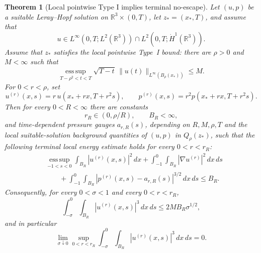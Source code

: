 \documentclass[11pt]{amsart}
\numberwithin{equation}{section}
\theoremstyle{plain}
\newtheorem{theorem}{Theorem}[section]
\theoremstyle{definition}
\theoremstyle{remark}
\newcommand{\esssup}{\operatorname*{ess\,sup}}
\begin{document}
\begin{theorem}[Local pointwise Type I implies terminal no-escape]
\label{thm:local-typeI-terminal-energy-package}
Let \((u,p)\) be a suitable Leray--Hopf solution on
\(\mathbb R^3\times(0,T)\), let \(z_*=(x_*,T)\), and assume that
\[
  u\in L^\infty(0,T;L^2(\mathbb R^3))
  \cap L^2(0,T;\dot H^1(\mathbb R^3)).
\]
Assume that \(z_*\) satisfies the local pointwise Type~I bound: there are
\(\rho>0\) and \(M<\infty\) such that
\begin{equation}\label{eq:local-typeI-terminal-noescape-assumption}
  \esssup_{T-\rho^2<t<T}
  \sqrt{T-t}\,\|u(t)\|_{L^\infty(B_\rho(x_*))}
  \le M .
\end{equation}
For \(0<r<\rho\), set
\[
  u^{(r)}(x,s)
  =
  r\,u(x_*+rx,T+r^2s),
  \qquad
  p^{(r)}(x,s)
  =
  r^2p(x_*+rx,T+r^2s).
\]
Then for every \(0<R<\infty\) there are constants
\[
  r_R\in(0,\rho/R),\qquad B_R<\infty,
\]
and time-dependent pressure gauges \(a_{r,R}(s)\), depending on
\(R,M,\rho,T\) and the local suitable-solution background quantities of
\((u,p)\) in \(Q_\rho(z_*)\), such that the following terminal local energy
estimate holds for every \(0<r<r_R\):
\begin{equation}\label{eq:local-terminal-energy-package}
\begin{aligned}
  &\esssup_{-1<s<0}\int_{B_R}|u^{(r)}(x,s)|^2\,dx
  +\int_{-1}^{0}\int_{B_R}|\nabla u^{(r)}|^2\,dx\,ds  \\
  &\qquad
  +\int_{-1}^{0}\int_{B_R}
      |p^{(r)}(x,s)-a_{r,R}(s)|^{3/2}\,dx\,ds
  \le B_R .
\end{aligned}
\end{equation}
Consequently, for every \(0<\sigma<1\) and every \(0<r<r_R\),
\begin{equation}\label{eq:local-terminal-noescape-bound}
  \int_{-\sigma}^{0}\int_{B_R}|u^{(r)}(x,s)|^3\,dx\,ds
  \le
  2MB_R\sigma^{1/2},
\end{equation}
and in particular
\begin{equation}\label{eq:local-terminal-noescape}
  \lim_{\sigma\downarrow0}
  \sup_{0<r<r_R}
  \int_{-\sigma}^{0}\int_{B_R}|u^{(r)}(x,s)|^3\,dx\,ds
  =0 .
\end{equation}
\end{theorem}
\end{document}
